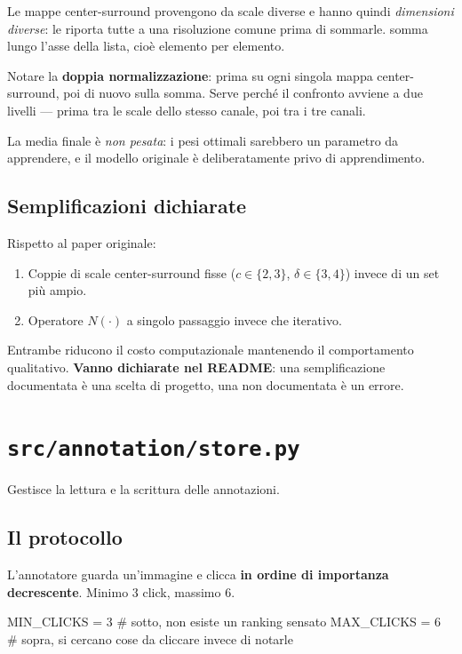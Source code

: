 Le mappe center-surround provengono da scale diverse e hanno quindi \emph{dimensioni diverse}:
 le riporta tutte a una risoluzione comune prima di sommarle.
 somma lungo l'asse della lista, cioè elemento per elemento.

Notare la \textbf{doppia normalizzazione}: prima su ogni singola mappa center-surround, poi di
nuovo sulla somma. Serve perché il confronto avviene a due livelli --- prima tra le scale dello
stesso canale, poi tra i tre canali.

La media finale è \emph{non pesata}: i pesi ottimali sarebbero un parametro da apprendere, e il
modello originale è deliberatamente privo di apprendimento.

\subsection{Semplificazioni dichiarate}

Rispetto al paper originale:

\begin{enumerate}
  \item Coppie di scale center-surround fisse ($c \in \{2,3\}$, $\delta \in \{3,4\}$) invece di
  un set più ampio.
  \item Operatore $N(\cdot)$ a singolo passaggio invece che iterativo.
\end{enumerate}

Entrambe riducono il costo computazionale mantenendo il comportamento qualitativo.
\textbf{Vanno dichiarate nel README}: una semplificazione documentata è una scelta di progetto,
una non documentata è un errore.

\section{\texttt{src/annotation/store.py}}

Gestisce la lettura e la scrittura delle annotazioni.

\subsection{Il protocollo}

L'annotatore guarda un'immagine e clicca \textbf{in ordine di importanza decrescente}. Minimo 3
click, massimo 6.

\begin{idebox}
\begin{pycode}
MIN_CLICKS = 3   # sotto, non esiste un ranking sensato
MAX_CLICKS = 6   # sopra, si cercano cose da cliccare invece di notarle
\end{pycode}
\end{idebox}

